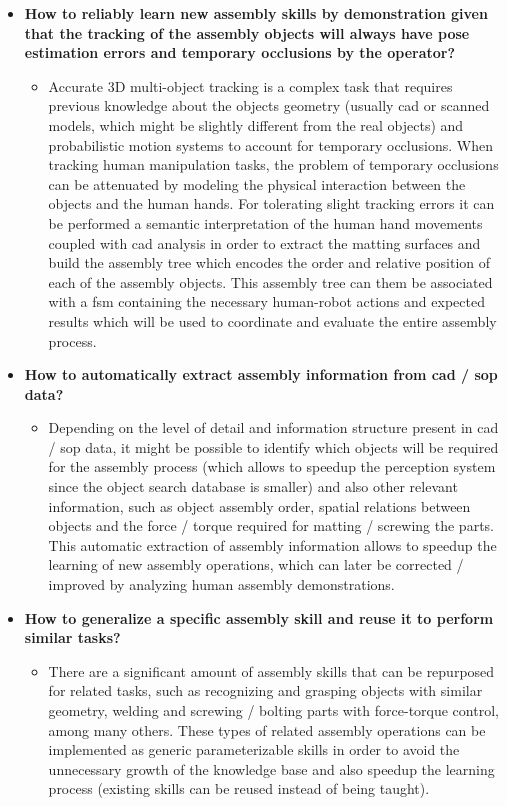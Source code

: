 \begin{itemize}
	\item \textbf{How to reliably learn new assembly skills by demonstration given that the tracking of the assembly objects will always have pose estimation errors and temporary occlusions by the operator?}
	\begin{itemize}
		\item Accurate 3D multi-object tracking is a complex task that requires previous knowledge about the objects geometry (usually \gls{cad} or scanned models, which might be slightly different from the real objects) and probabilistic motion systems to account for temporary occlusions. When tracking human manipulation tasks, the problem of temporary occlusions can be attenuated by modeling the physical interaction between the objects and the human hands. For tolerating slight tracking errors it can be performed a semantic interpretation of the human hand movements coupled with \gls{cad} analysis in order to extract the matting surfaces and build the assembly tree which encodes the order and relative position of each of the assembly objects. This assembly tree can them be associated with a \gls{fsm} containing the necessary human-robot actions and expected results which will be used to coordinate and evaluate the entire assembly process.
	\end{itemize}

	\item \textbf{How to automatically extract assembly information from \gls{cad} / \gls{sop} data?}
	\begin{itemize}
		\item Depending on the level of detail and information structure present in \gls{cad} / \gls{sop} data, it might be possible to identify which objects will be required for the assembly process (which allows to speedup the perception system since the object search database is smaller) and also other relevant information, such as object assembly order, spatial relations between objects and the force / torque required for matting / screwing the parts. This automatic extraction of assembly information allows to speedup the learning of new assembly operations, which can later be corrected / improved by analyzing human assembly demonstrations.
	\end{itemize}

	\item \textbf{How to generalize a specific assembly skill and reuse it to perform similar tasks?}
	\begin{itemize}
		\item There are a significant amount of assembly skills that can be repurposed for related tasks, such as recognizing and grasping objects with similar geometry, welding and screwing / bolting parts with force-torque control, among many others. These types of related assembly operations can be implemented as generic parameterizable skills in order to avoid the unnecessary growth of the knowledge base and also speedup the learning process (existing skills can be reused instead of being taught).
	\end{itemize}


\end{itemize}
